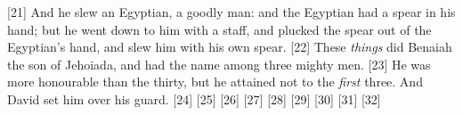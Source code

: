 [21] \textcolor[rgb]{0.00,0.00,1.00}{And he slew an Egyptian, a goodly man: and the Egyptian had a spear in his hand; but he went down to him with a staff, and plucked the spear out of the Egyptian's hand, and slew him with his own spear.}
[22] \textcolor[rgb]{0.00,0.00,1.00}{These \emph{things} did Benaiah the son of Jehoiada, and had the name among three mighty men.}
[23] \textcolor[rgb]{0.00,0.00,1.00}{He was more honourable than the thirty, but he attained not to the \emph{first} three. And David set him over his guard.}
[24] \textcolor[rgb]{0.00,0.00,1.00}{}
[25] \textcolor[rgb]{0.00,0.00,1.00}{}
[26] \textcolor[rgb]{0.00,0.00,1.00}{}
[27] \textcolor[rgb]{0.00,0.00,1.00}{}
[28] \textcolor[rgb]{0.00,0.00,1.00}{}
[29] \textcolor[rgb]{0.00,0.00,1.00}{}
[30] \textcolor[rgb]{0.00,0.00,1.00}{}
[31] \textcolor[rgb]{0.00,0.00,1.00}{}
[32] \textcolor[rgb]{0.00,0.00,1.00}{}





\newpage
